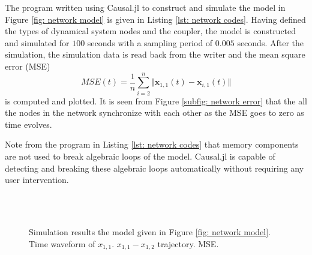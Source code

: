 \documentclass{juliacon}
\begin{document}
{The program written using Causal.jl to construct and simulate the model in Figure \ref{fig: network model} is given in Listing \ref{lst: network codes}. Having defined the types of dynamical system nodes and the coupler, the model is constructed and simulated for $100$ seconds with a sampling period of $0.005$ seconds. After the simulation, the simulation data is read back from the writer and the mean square error (MSE) 
\begin{equation}
    MSE(t) = \dfrac{1}{n} \sum_{i = 2}^n \Vert \bm{x}_{1,1}(t) - \bm{x}_{i,1}(t) \Vert
\end{equation}
is computed and plotted. It is seen from Figure \ref{subfig: network error} that the all the nodes in the network synchronize with each other as the MSE goes to zero as time evolves. 

Note from the program in Listing \ref{lst: network codes} that memory components are not used to break algebraic loops of the model. Causal.jl is capable of detecting and breaking these algebraic loops automatically without requiring any user intervention. 

\begin{figure}
    \centering
    \\[-0.1cm]
     \\[-0.1cm]
    \caption{Simulation results the model given in Figure \ref{fig: network model}. \protect{} Time waveform of $x_{1,1}$. \protect{} $x_{1,1} - x_{1,2}$ trajectory. \protect{} MSE.}
    \label{fig: network simulation results}
\end{figure}

}
\end{document}
